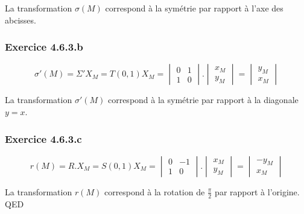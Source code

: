 \documentclass[]{book}
\theoremstyle{definition}
\begin{document}
La transformation $\sigma(M)$ correspond \`a la sym\'etrie par rapport \`a l'axe des abcisses.

\subsubsection*{Exercice 4.6.3.b}
$$\sigma'(M) = \Sigma' X_M = T(0,1) X_M = \begin{vmatrix} 0 & 1 \\ 1 & 0 \end{vmatrix} . \begin{vmatrix} x_M \\ y_M \end{vmatrix} =
\begin{vmatrix} y_M \\ x_M \end{vmatrix}
$$

La transformation $\sigma'(M)$ correspond \`a la sym\'etrie par rapport \`a la diagonale $y=x$.\\

\subsubsection*{Exercice 4.6.3.c}
$$r(M) = R.X_M = S(0,1) X_M = \begin{vmatrix} 0 & -1 \\ 1 & 0 \end{vmatrix} . \begin{vmatrix} x_M \\ y_M \end{vmatrix} =
\begin{vmatrix} -y_M \\ x_M \end{vmatrix}
$$

La transformation $r(M)$ correspond \`a la rotation de $\frac{\pi}{2}$ par rapport \`a l'origine.\\



QED
\end{document}
